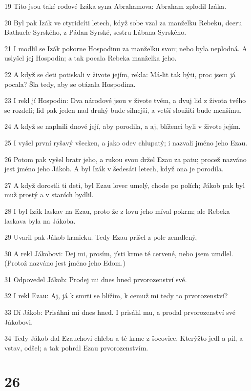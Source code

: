 \par 19 Tito jsou také rodové Izáka syna Abrahamova: Abraham zplodil Izáka.
\par 20 Byl pak Izák ve ctyridcíti letech, když sobe vzal za manželku Rebeku, dceru Bathuele Syrského, z Pádan Syrské, sestru Lábana Syrského.
\par 21 I modlil se Izák pokorne Hospodinu za manželku svou; nebo byla neplodná. A uslyšel jej Hospodin; a tak pocala Rebeka manželka jeho.
\par 22 A když se deti potiskali v živote jejím, rekla: Má-lit tak býti, proc jsem já pocala? Šla tedy, aby se otázala Hospodina.
\par 23 I rekl jí Hospodin: Dva národové jsou v živote tvém, a dvuj lid z života tvého se rozdelí; lid pak jeden nad druhý bude silnejší, a vetší sloužiti bude menšímu.
\par 24 A když se naplnili dnové její, aby porodila, a aj, blíženci byli v živote jejím.
\par 25 I vyšel první ryšavý všecken, a jako odev chlupatý; i nazvali jméno jeho Ezau.
\par 26 Potom pak vyšel bratr jeho, a rukou svou držel Ezau za patu; procež nazváno jest jméno jeho Jákob. A byl Izák v šedesáti letech, když ona je porodila.
\par 27 A když dorostli ti deti, byl Ezau lovec umelý, chode po polích; Jákob pak byl muž prostý a v staních bydlil.
\par 28 I byl Izák laskav na Ezau, proto že z lovu jeho míval pokrm; ale Rebeka laskava byla na Jákoba.
\par 29 Uvaril pak Jákob krmicku. Tedy Ezau prišel z pole zemdlený,
\par 30 A rekl Jákobovi: Dej mi, prosím, jísti krme té cervené, nebo jsem umdlel. (Protož nazváno jest jméno jeho Edom.)
\par 31 Odpovedel Jákob: Prodej mi dnes hned prvorozenství své.
\par 32 I rekl Ezau: Aj, já k smrti se blížím, k cemuž mi tedy to prvorozenství?
\par 33 Dí Jákob: Prisáhni mi dnes hned. I prisáhl mu, a prodal prvorozenství své Jákobovi.
\par 34 Tedy Jákob dal Ezauchovi chleba a té krme z šocovice. Kterýžto jedl a pil, a vstav, odšel; a tak pohrdl Ezau prvorozenstvím.

\chapter{26}


